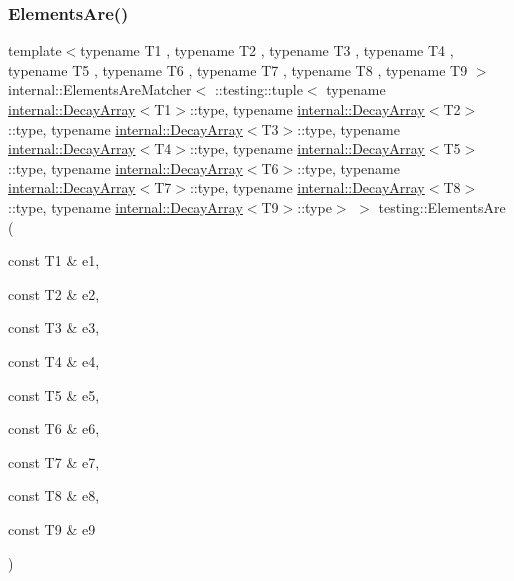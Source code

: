 \subsubsection{\texorpdfstring{ElementsAre()}{ElementsAre()}\hspace{0.1cm}{\footnotesize\ttfamily [10/11]}}
{\footnotesize\ttfamily template$<$typename T1 , typename T2 , typename T3 , typename T4 , typename T5 , typename T6 , typename T7 , typename T8 , typename T9 $>$ \\
internal\+::\+Elements\+Are\+Matcher$<$ \+::testing\+::tuple$<$ typename \mbox{\hyperlink{structtesting_1_1internal_1_1_decay_array}{internal\+::\+Decay\+Array}}$<$T1$>$\+::type, typename \mbox{\hyperlink{structtesting_1_1internal_1_1_decay_array}{internal\+::\+Decay\+Array}}$<$T2$>$\+::type, typename \mbox{\hyperlink{structtesting_1_1internal_1_1_decay_array}{internal\+::\+Decay\+Array}}$<$T3$>$\+::type, typename \mbox{\hyperlink{structtesting_1_1internal_1_1_decay_array}{internal\+::\+Decay\+Array}}$<$T4$>$\+::type, typename \mbox{\hyperlink{structtesting_1_1internal_1_1_decay_array}{internal\+::\+Decay\+Array}}$<$T5$>$\+::type, typename \mbox{\hyperlink{structtesting_1_1internal_1_1_decay_array}{internal\+::\+Decay\+Array}}$<$T6$>$\+::type, typename \mbox{\hyperlink{structtesting_1_1internal_1_1_decay_array}{internal\+::\+Decay\+Array}}$<$T7$>$\+::type, typename \mbox{\hyperlink{structtesting_1_1internal_1_1_decay_array}{internal\+::\+Decay\+Array}}$<$T8$>$\+::type, typename \mbox{\hyperlink{structtesting_1_1internal_1_1_decay_array}{internal\+::\+Decay\+Array}}$<$T9$>$\+::type$>$ $>$ testing\+::\+Elements\+Are (\begin{DoxyParamCaption}\item[{const T1 \&}]{e1,  }\item[{const T2 \&}]{e2,  }\item[{const T3 \&}]{e3,  }\item[{const T4 \&}]{e4,  }\item[{const T5 \&}]{e5,  }\item[{const T6 \&}]{e6,  }\item[{const T7 \&}]{e7,  }\item[{const T8 \&}]{e8,  }\item[{const T9 \&}]{e9 }\end{DoxyParamCaption})\hspace{0.3cm}{\ttfamily [inline]}}

\mbox{\label{namespacetesting_a047f5f5a28c156a70002668323009ae9}} 

